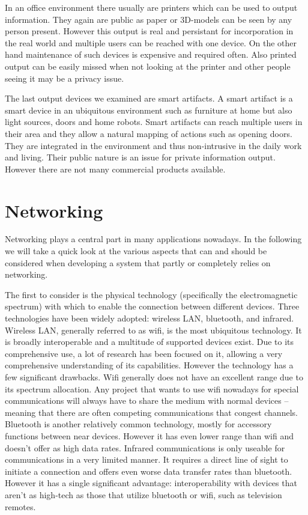 \documentclass{acm_proc_article-sp}
\begin{document}
In an office environment there usually are printers which can be used to output information.
They again are public as paper or 3D-models can be seen by any person present.
However this output is real and persistant for incorporation in the real world and multiple users can be reached with one device.
On the other hand maintenance of such devices is expensive and required often.
Also printed output can be easily missed when not looking at the printer and other people seeing it may be a privacy issue.

The last output devices we examined are smart artifacts.
A smart artifact is a smart device in an ubiquitous environment such as furniture at home but also light sources, doors and home robots.
Smart artifacts can reach multiple users in their area and they allow a natural mapping of actions such as opening doors.
They are integrated in the environment and thus non-intrusive in the daily work and living.
Their public nature is an issue for private information output.
However there are not many commercial products available.

\section{Networking}

Networking plays a central part in many applications nowadays.
In the following we will take a quick look at the various aspects that can and should be considered when developing a system that partly or completely relies on networking.

The first to consider is the physical technology (specifically the electromagnetic spectrum) with which to enable the connection between different devices.
Three technologies have been widely adopted: wireless LAN, bluetooth, and infrared.
Wireless LAN, generally referred to as wifi, is the most ubiquitous technology.
It is broadly interoperable and a multitude of supported devices exist.
Due to its comprehensive use, a lot of research has been focused on it, allowing a very comprehensive understanding of its capabilities.
However the technology has a few significant drawbacks.
Wifi generally does not have an excellent range due to its spectrum allocation.
Any project that wants to use wifi nowadays for special communications will always have to share the medium with normal devices – meaning that there are often competing communications that congest channels.
Bluetooth is another relatively common technology, mostly for accessory functions between near devices.
However it has even lower range than wifi and doesn’t offer as high data rates.
Infrared communications is only useable for communications in a very limited manner.
It requires a direct line of sight to initiate a connection and offers even worse data transfer rates than bluetooth.
However it has a single significant advantage: interoperability with devices that aren’t as high-tech as those that utilize bluetooth or wifi, such as television remotes.
\end{document}
